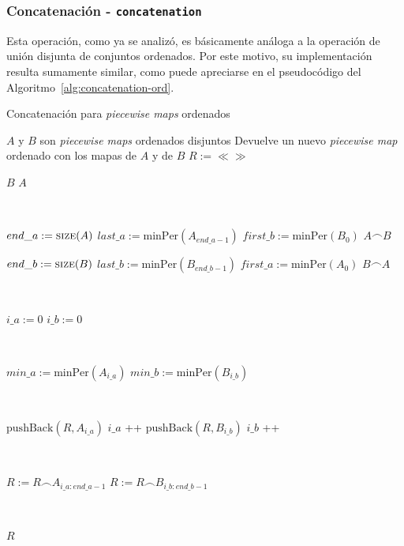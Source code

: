 \subsubsection{Concatenación - \texttt{concatenation}}

Esta operación, como ya se analizó, es básicamente análoga a la operación 
de unión disjunta de conjuntos ordenados.  
Por este motivo, su implementación resulta sumamente similar, 
como puede apreciarse en el pseudocódigo del Algoritmo~\ref{alg:concatenation-ord}.


\begin{algorithm}
\caption{Concatenación para \textit{piecewise maps} ordenados}
\label{alg:concatenation-ord}
\begin{algorithmic}[1]
\Require $A$ y $B$ son \textit{piecewise maps} ordenados disjuntos
\Ensure Devuelve un nuevo \textit{piecewise map} ordenado con los mapas de $A$ y de $B$
    \State $R := \ll\gg$ 

        \State \Return $B$
    \EndIf
        \State \Return$A$
    \EndIf
    
 \

    \State $end\_a := \Call{size}{A}$
    \State $last\_a := \mathrm{minPer}(A_{end\_a-1})$
    \State $first\_b := \mathrm{minPer}(B_0)$
        \State \Return $A \frown B$
    \EndIf

    \State $end\_b := \Call{size}{B}$
    \State $last\_b := \mathrm{minPer}(B_{end\_b-1})$
    \State $first\_a := \mathrm{minPer}(A_0)$
       \State \Return $B \frown A$
    \EndIf

 \

    \State $i\_a  := 0$
    \State $i\_b  := 0$

    
 \

        \State $min\_a := \mathrm{minPer}(A_{i\_a})$
        \State $min\_b := \mathrm{minPer}(B_{i\_b})$

 \

        \State $ \mathrm{pushBack} (R, A_{i\_a})$
        \State $i\_a$ \!+\!+
      \Else 
        \State $\mathrm{pushBack} (R, B_{i\_b})$
        \State $i\_b$ \!+\!+
      \EndIf   
    \EndFor
    
    \
    
    \State $R := R \frown A_{i\_a:end\_a - 1}$
    \State $R := R \frown B_{i\_b:end\_b - 1}$
    
    \
    
    \State \Return $R$
\EndFunction
\end{algorithmic}
\end{algorithm}



